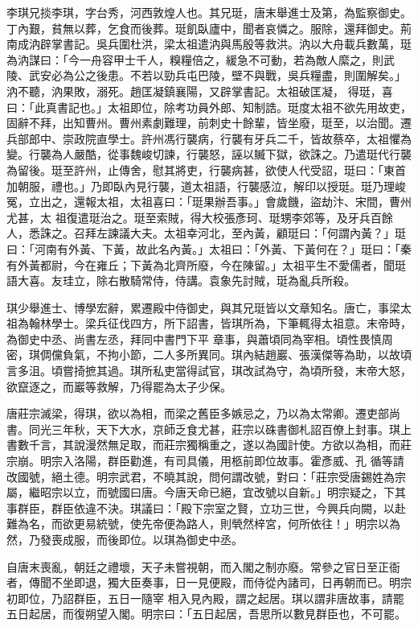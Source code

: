 \begin{pinyinscope}
 李琪兄掞李琪，字台秀，河西敦煌人也。其兄珽，唐末舉進士及第，為監察御史。丁內艱，貧無以葬，乞食而後葬。珽飢臥廬中，聞者哀憐之。服除，還拜御史。荊南成汭辟掌書記。吳兵圍杜洪，梁太祖遣汭與馬殷等救洪。汭以大舟載兵數萬，珽為汭謀曰：「今一舟容甲士千人，糗糧倍之，緩急不可動，若為敵人縻之，則武陵、武安必為公之後患。不若以勁兵屯巴陵，壁不與戰，吳兵糧盡，則圍解矣。」汭不聽，汭果敗，溺死。趙匡凝鎮襄陽，又辟掌書記。太祖破匡凝，
 得珽，喜曰：「此真書記也。」太祖即位，除考功員外郎、知制誥。珽度太祖不欲先用故吏，固辭不拜，出知曹州。曹州素劇難理，前刺史十餘輩，皆坐廢，珽至，以治聞。遷兵部郎中、崇政院直學士。許州馮行襲病，行襲有牙兵二千，皆故蔡卒，太祖懼為變。行襲為人嚴酷，從事魏峻切諫，行襲怒，誣以贓下獄，欲誅之。乃遣珽代行襲為留後。珽至許州，止傳舍，慰其將吏，行襲病甚，欲使人代受詔，珽曰：「東首加朝服，禮也。」乃即臥內見行襲，道太祖語，行襲感泣，解印以授珽。珽乃理峻冤，立出之，還報太祖，太祖喜曰：「珽果辦吾事。」會歲饑，盜劫汴、宋間，曹州尤甚，太
 祖復遣珽治之。珽至索賊，得大校張彥珂、珽甥李郊等，及牙兵百餘人，悉誅之。召拜左諫議大夫。太祖幸河北，至內黃，顧珽曰：「何謂內黃？」珽曰：「河南有外黃、下黃，故此名內黃。」太祖曰：「外黃、下黃何在？」珽曰：「秦有外黃都尉，今在雍丘；下黃為北齊所廢，今在陳留。」太祖平生不愛儒者，聞珽語大喜。友珪立，除右散騎常侍，侍講。袁象先討賊，珽為亂兵所殺。



 琪少舉進士、博學宏辭，累遷殿中侍御史，與其兄珽皆以文章知名。唐亡，事梁太祖為翰林學士。梁兵征伐四方，所下詔書，皆琪所為，下筆輒得太祖意。末帝時，為御史中丞、尚書左丞，拜同中書門下平
 章事，與蕭頃同為宰相。頃性畏慎周密，琪倜儻負氣，不拘小節，二人多所異同。琪內結趙巖、張漢傑等為助，以故頃言多沮。頃嘗掎摭其過。琪所私吏當得試官，琪改試為守，為頃所發，末帝大怒，欲竄逐之，而巖等救解，乃得罷為太子少保。



 唐莊宗滅梁，得琪，欲以為相，而梁之舊臣多嫉忌之，乃以為太常卿。遷吏部尚書。同光三年秋，天下大水，京師乏食尤甚，莊宗以硃書御札詔百僚上封事。琪上書數千言，其說漫然無足取，而莊宗獨稱重之，遂以為國計使。方欲以為相，而莊宗崩。明宗入洛陽，群臣勸進，有司具儀，用柩前即位故事。霍彥威、孔
 循等請改國號，絕土德。明宗武君，不曉其說，問何謂改號，對曰：「莊宗受唐錫姓為宗屬，繼昭宗以立，而號國曰唐。今唐天命已絕，宜改號以自新。」明宗疑之，下其事群臣，群臣依違不決。琪議曰：「殿下宗室之賢，立功三世，今興兵向闕，以赴難為名，而欲更易統號，使先帝便為路人，則煢然梓宮，何所依往！」明宗以為然，乃發喪成服，而後即位。以琪為御史中丞。



 自唐末喪亂，朝廷之禮壞，天子未嘗視朝，而入閣之制亦廢。常參之官日至正衙者，傳聞不坐即退，獨大臣奏事，日一見便殿，而侍從內諸司，日再朝而已。明宗初即位，乃詔群臣，五日一隨宰
 相入見內殿，謂之起居。琪以謂非唐故事，請罷五日起居，而復朔望入閣。明宗曰：「五日起居，吾思所以數見群臣也，不可罷。




\end{pinyinscope}
